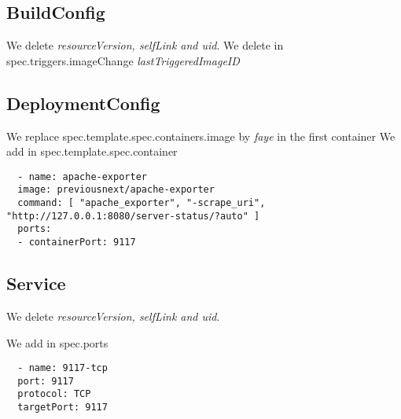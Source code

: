 \subsection{BuildConfig}
We delete \emph{resourceVersion, selfLink and uid}. We delete in spec.triggers.imageChange \emph{lastTriggeredImageID}

\subsection{DeploymentConfig}
We replace spec.template.spec.containers.image by \emph{faye} in the first container
We add in spec.template.spec.container

\begin{verbatim}
  - name: apache-exporter
  image: previousnext/apache-exporter
  command: [ "apache_exporter", "-scrape_uri", "http://127.0.0.1:8080/server-status/?auto" ]
  ports:
  - containerPort: 9117
\end{verbatim}

\subsection{Service}
We delete \emph{resourceVersion, selfLink and uid}.

We add in spec.ports

\begin{verbatim}
  - name: 9117-tcp
  port: 9117
  protocol: TCP
  targetPort: 9117
\end{verbatim}